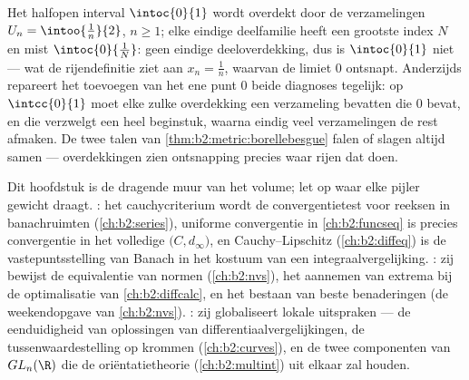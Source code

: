 \begin{example}\label{ex:b2:metric:covers}
Het halfopen interval $\intoc{0}{1}$ wordt overdekt door de 
verzamelingen $U_n = \intoo{\frac1n}{2}$, $n \geq 1$; elke eindige
deelfamilie heeft een grootste index $N$ en mist
$\intoc{0}{\frac1N}$: geen eindige deeloverdekking, dus is
$\intoc{0}{1}$ niet  --- wat de rijendefinitie ziet aan $x_n
= \frac1n$, waarvan de limiet $0$ ontsnapt. Anderzijds repareert
het toevoegen van het ene punt $0$ beide diagnoses tegelijk: op
$\intcc{0}{1}$ moet elke zulke overdekking een verzameling bevatten
die $0$ bevat, en die verzwelgt een heel beginstuk, waarna eindig
veel verzamelingen de rest afmaken. De twee talen van
\cref{thm:b2:metric:borellebesgue} falen of slagen altijd samen ---
overdekkingen zien ontsnapping precies waar rijen dat doen.
\end{example}

\begin{remark}\label{rem:b2:metric:perspectives}
Dit hoofdstuk is de dragende muur van het volume; let op waar elke
pijler gewicht draagt. \emph{}: het cauchycriterium
wordt de convergentietest voor reeksen in banachruimten
(\cref{ch:b2:series}), uniforme convergentie in
\cref{ch:b2:funcseq} is precies convergentie in het volledige
$\bigl(C, d_\infty\bigr)$, en Cauchy--Lipschitz
(\cref{ch:b2:diffeq}) is de vastepuntsstelling van Banach in het
kostuum van een integraalvergelijking. \emph{}: zij
bewijst de equivalentie van normen (\cref{ch:b2:nvs}), het
aannemen van extrema bij de optimalisatie van
\cref{ch:b2:diffcalc}, en het bestaan van beste benaderingen (de
weekendopgave van \cref{ch:b2:nvs}). \emph{}: zij
globaliseert lokale uitspraken --- de eenduidigheid van
oplossingen van differentiaalvergelijkingen, de
tussenwaardestelling op krommen (\cref{ch:b2:curves}), en de twee
componenten van $GL_n(\R)$ die de oriëntatietheorie
(\cref{ch:b2:multint}) uit elkaar zal houden.
\end{remark}

